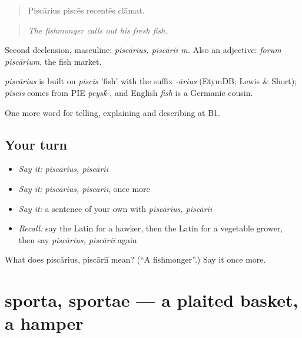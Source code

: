 \begin{quote}
Piscārius piscēs recentēs clāmat.
\end{quote}

\begin{quote}
\emph{The fishmonger calls out his fresh fish.}
\end{quote}

Second declension, masculine: \emph{piscārius, piscāriī m.} Also an adjective: \emph{forum piscārium}, the fish market.

\begin{cousinweb}
\emph{piscārius} is built on \emph{piscis} 'fish' with the suffix \emph{-ārius} (EtymDB; Lewis \& Short); \emph{piscis} comes from PIE \emph{peys\'{k}-}, and English \emph{fish} is a Germanic cousin.
\end{cousinweb}

\begin{grammarlens}[title={What you've built}]
One more word for telling, explaining and describing at B1.
\end{grammarlens}

\subsection*{Your turn}
\begin{itemize}
\raggedright
  \item \emph{Say it:} \emph{piscārius, piscāriī}
  \item \emph{Say it:} \emph{piscārius, piscāriī}, once more
  \item \emph{Say it:} a sentence of your own with \emph{piscārius, piscāriī}
  \item \emph{Recall:} say the Latin for a hawker, then the Latin for a vegetable grower, then say \emph{piscārius, piscāriī} again
\end{itemize}

\begin{tcolorbox}[breakable,colback=teal!4,colframe=teal!35!black,title={Before you move on}]
What does piscārius, piscāriī mean? (\textquotedblleft{}A fishmonger\textquotedblright{}.) Say it once more.
\end{tcolorbox}
\section[sporta, sportae]{sporta, sportae — a plaited basket, a hamper}

\label{lesson:LA-C463-sporta}



